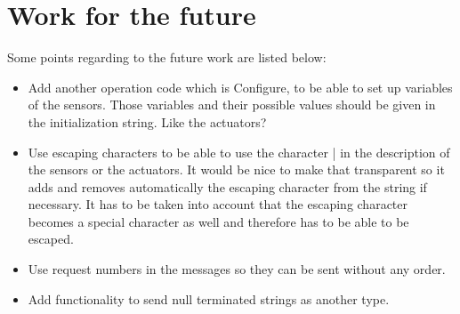 \documentclass[11pt,a4paper,oneside]{book}
\begin{document}
\chapter{Work for the future}

Some points regarding to the future work are listed below:

\begin{itemize}
\item Add another operation code which is Configure, to be able to set up variables of the sensors. Those variables and their possible values should be given in the initialization string. Like the actuators?

\item Use escaping characters to be able to use the character | in the description of the sensors or the actuators. It would be nice to make that transparent so it adds and removes automatically the escaping character from the string if necessary. It has to be taken into account that the escaping character becomes a special character as well and therefore has to be able to be escaped.

\item Use request numbers in the messages so they can be sent without any order.

\item Add functionality to send null terminated strings as another type.

\end{itemize}
\end{document}
